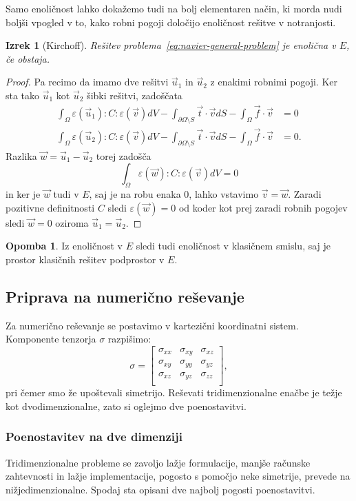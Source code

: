 \documentclass[12pt,a4paper,twoside]{article}
\theoremstyle{definition} %
\newtheorem{opomba}[definicija]{Opomba}
\theoremstyle{plain} %
\newtheorem{izrek}[definicija]{Izrek}
\numberwithin{equation}{section}
\newcommand{\eps}{\varepsilon}
\newcommand{\vv}{\vec{v}}
\newcommand{\vt}{\vec{t}}
\newcommand{\vu}{\vec{u}}
\newcommand{\vw}{\vec{w}}
\newcommand{\vf}{\vec{f}}
\newcommand{\ts}{\sigma}
\begin{document}
Samo enoličnost lahko dokažemo tudi na bolj elementaren način, ki morda nudi boljši
vpogled v to, kako robni pogoji določijo enoličnost rešitve v notranjosti.
\begin{izrek}[Kirchoff]
  Rešitev problema~\ref{eq:navier-general-problem} je enolična v
  $E$, če obstaja.
\end{izrek}
\begin{proof}
Pa recimo da imamo dve rešitvi $\vu_1$ in $\vu_2$ z enakimi robnimi pogoji.
Ker sta tako $\vu_1$ kot $\vu_2$ šibki rešitvi, zadoščata
\begin{align*}
\int_{\Omega}\eps(\vu_1) : C : \eps(\vv) dV - \int_{\partial \Omega\setminus S} \vt\cdot \vv dS -
\int_{\Omega} \vf\cdot \vv &= 0 \\
\int_{\Omega}\eps(\vu_2) : C : \eps(\vv) dV - \int_{\partial \Omega\setminus S} \vt\cdot \vv dS -
\int_{\Omega} \vf\cdot \vv &= 0.
\end{align*}
Razlika $\vw = \vu_1 - \vu_2$ torej zadošča \[ \int_{\Omega}\eps(\vw) : C : \eps(\vv) dV = 0 \] in ker
je $\vw$ tudi v $E$, saj je na robu enaka 0, lahko vstavimo $\vv = \vw$.
Zaradi pozitivne definitnosti $C$ sledi $\eps(\vw) = 0$ od koder kot prej zaradi
robnih pogojev sledi $\vw = 0$ oziroma $\vu_1 = \vu_2$.
\end{proof}
\begin{opomba}
  Iz enoličnost v $E$ sledi tudi enoličnost v klasičnem smislu, saj je prostor klasičnih rešitev
  podprostor v $E$.
\end{opomba}

\subsection{Priprava na numerično reševanje}
Za numerično reševanje se postavimo v kartezični koordinatni sistem.
Komponente tenzorja $\ts$ razpišimo:
\[
  \ts =
  \begin{bmatrix}
    \ts_{xx} & \ts_{xy} & \ts_{xz} \\
    \ts_{xy} & \ts_{yy} & \ts_{yz} \\
    \ts_{xz} & \ts_{yz} & \ts_{zz} \\
  \end{bmatrix},
\]
pri čemer smo že upoštevali simetrijo. Reševati tridimenzionalne enačbe je težje
kot dvodimenzionalne, zato si oglejmo dve poenostavitvi.

\subsubsection{Poenostavitev na dve dimenziji}
Tridimenzionalne probleme se zavoljo lažje formulacije, manjše računske
zahtevnosti in lažje implementacije, pogosto s pomočjo neke simetrije, prevede na
nižjedimenzionalne. Spodaj sta opisani dve najbolj pogosti poenostavitvi.
\end{document}
